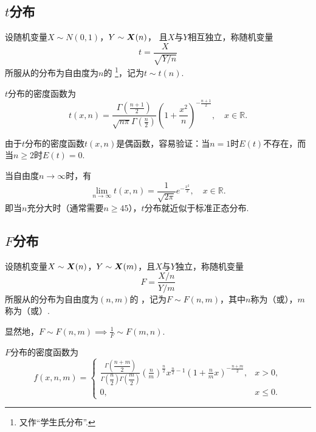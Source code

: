 \subsection{\texorpdfstring{\(t\)}{t}分布}
\begin{definition}
设随机变量\(X \sim N(0,1)\)，\(Y \sim \boldsymbol{X}(n)\)，%
且\(X\)与\(Y\)相互独立，称随机变量\[
t = \frac{X}{\sqrt{Y/n}}
\]所服从的分布为自由度为\(n\)的  \footnote{又作“学生氏分布”.}，记为\(t \sim t(n)\).
\end{definition}

\begin{theorem}\label{theorem:数理统计的基础知识.学生氏分布的密度函数}
\(t\)分布的密度函数为\[
t(x,n) = \frac{ \Gamma\left(\frac{n+1}{2}\right) }{ \sqrt{n\pi} \Gamma\left(\frac{n}{2}\right) } \left(1+\frac{x^2}{n}\right)^{-\frac{n+1}{2}},
\quad x \in \mathbb{R}.
\]
\end{theorem}

由于\(t\)分布的密度函数\(t(x,n)\)是偶函数，容易验证：当\(n=1\)时\(E(t)\)不存在，而当\(n \geqslant 2\)时\(E(t)=0\).

当自由度\(n\to\infty\)时，有\[
\lim\limits_{n\to\infty} t(x,n) = \frac{1}{\sqrt{2\pi}} e^{-\frac{x^2}{2}},
\quad x \in \mathbb{R}.
\]即当\(n\)充分大时（通常需要\(n \geqslant 45\)），\(t\)分布就近似于标准正态分布.

\subsection{\texorpdfstring{\(F\)}{F}分布}
\begin{definition}
设随机变量\(X \sim \boldsymbol{X}(n)\)，\(Y \sim \boldsymbol{X}(m)\)，且\(X\)与\(Y\)独立，称随机变量\[
F=\frac{X/n}{Y/m}
\]所服从的分布为自由度为\((n,m)\)的  ，记为\(F \sim F(n,m)\)，其中\(n\)称为（或），\(m\)称为（或）.
\end{definition}

显然地，\(F \sim F(n,m) \implies \frac{1}{F} \sim F(m,n)\).

\begin{theorem}
\(F\)分布的密度函数为\[
f(x,n,m) = \left\{ \begin{array}{cl}
\frac{\Gamma\left(\dfrac{n+m}{2}\right)}{\Gamma\left(\dfrac{n}{2}\right) \Gamma\left(\dfrac{m}{2}\right)} \left(\frac{n}{m}\right)^{\frac{n}{2}} x^{\frac{n}{2}-1} \left(1+\frac{n}{m}x\right)^{-\frac{n+m}{2}}, & x > 0, \\
0, & x \leqslant 0.
\end{array} \right.
\]
\end{theorem}

